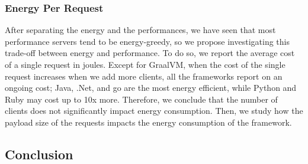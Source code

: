 \subsubsection{Energy Per Request}
After separating the energy and the performances, we have seen that most performance servers tend to be energy-greedy, so we propose investigating this trade-off between energy and performance.
To do so, we report the average cost of a single request in joules.
Except for GraalVM, when the cost of the single request increases when we add more clients, all the frameworks report on an ongoing cost; Java, .Net, and go are the most energy efficient, while Python and Ruby may cost up to 10x more.
Therefore, we conclude that the number of clients does not significantly impact energy consumption.
Then, we study how the payload size of the requests impacts the energy consumption of the framework.




\subsection{Conclusion }
